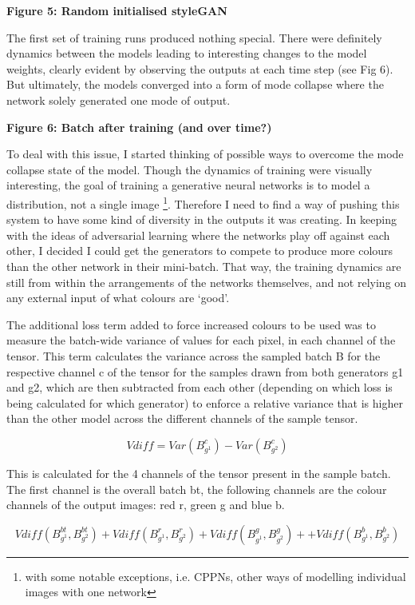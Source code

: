 \textbf{Figure 5: Random initialised styleGAN}

The first set of training runs produced nothing special. 
There were definitely dynamics between the models leading to interesting changes to the model weights, clearly evident by observing the outputs at each time step (see Fig 6). 
But ultimately, the models converged into a form of mode collapse where the network solely generated one mode of output. 

\textbf{Figure 6: Batch after training (and over time?)}

To deal with this issue, I started thinking of possible ways to overcome the mode collapse state of the model. 
Though the dynamics of training were visually interesting, the goal of training a generative neural networks is to model a distribution, not a single image \footnote{with some notable exceptions, i.e. CPPNs, other ways of modelling individual images with one network}. 
Therefore I need to find a way of pushing this system to have some kind of diversity in the outputs it was creating. In keeping with the ideas of adversarial learning where the networks play off against each other, I decided I could get the generators to compete to produce more colours than the other network in their mini-batch. 
That way, the training dynamics are still from within the arrangements of the networks themselves, and not relying on any external input of what colours are ‘good’.

The additional loss term added to force increased colours to be used was to measure the batch-wide variance of values for each pixel, in each channel of the tensor. 
This term calculates the variance across the sampled batch B for the respective channel c of the tensor for the samples drawn from both generators g1 and g2, which are then subtracted from each other (depending on which loss is being calculated for which generator) to enforce a relative variance that is higher than the other model across the different channels of the sample tensor.

\begin{equation}
    \label{eq:variance-gan}
    Vdiff = Var(B_{g^{1}}^{c}) - Var(B_{g^{2}}^{c})
    \end{equation}

This is calculated for the 4 channels of the tensor present in the sample batch. 
The first channel is the overall batch bt, the following channels are the colour channels of the output images: red r, green g and blue b.

\begin{equation}
    \label{eq:total-gan}
        Vdiff(B_{g^{1}}^{bt} , B_{g^{2}}^{bt}) + Vdiff(B_{g^{1}}^{r} , B_{g^{2}}^{r}) + Vdiff(B_{g^{1}}^{g} , B_{g^{2}}^{g}) + + Vdiff(B_{g^{1}}^{b} , B_{g^{2}}^{b}) 
    \end{equation}

